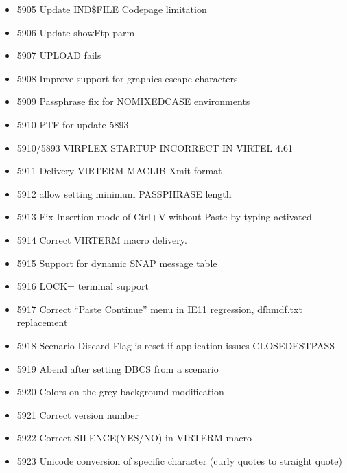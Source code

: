 \documentclass[letterpaper,10pt,english]{sphinxmanual}
\begin{document}
\begin{itemize}
\item {} 
5905 Update IND\$FILE Codepage limitation

\item {} 
5906 Update showFtp parm

\item {} 
5907 UPLOAD fails

\item {} 
5908 Improve support for graphics escape characters

\item {} 
5909 Passphrase fix for NOMIXEDCASE environments

\item {} 
5910 PTF for update 5893

\item {} 
5910/5893 VIRPLEX STARTUP INCORRECT IN VIRTEL 4.61

\item {} 
5911 Delivery VIRTERM MACLIB Xmit format

\item {} 
5912 allow setting minimum PASSPHRASE length

\item {} 
5913 Fix Insertion mode of Ctrl+V without Paste by typing activated

\item {} 
5914 Correct VIRTERM macro delivery.

\item {} 
5915 Support for dynamic SNAP message table

\item {} 
5916 LOCK= terminal support

\item {} 
5917 Correct “Paste Continue” menu in IE11 regression, dfhmdf.txt replacement

\item {} 
5918 Scenario Discard Flag is reset if application issues CLOSEDESTPASS

\item {} 
5919 Abend after setting DBCS from a scenario

\item {} 
5920 Colors on the grey background modification

\item {} 
5921 Correct version number

\item {} 
5922 Correct SILENCE(YES/NO) in VIRTERM macro

\item {} 
5923 Unicode conversion of specific character (curly quotes to straight quote)


\end{itemize}
\end{document}
